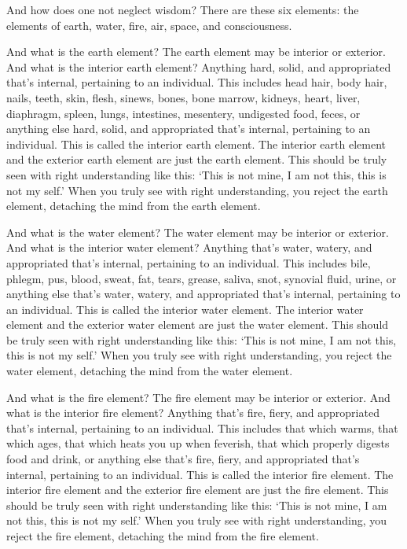 \documentclass[12pt,openany]{book}%
\begin{document}
And how does one not neglect wisdom? There are these six elements: the elements of earth, water, fire, air, space, and consciousness. 

And what is the earth element? The earth element may be interior or exterior. And what is the interior earth element? Anything hard, solid, and appropriated that’s internal, pertaining to an individual. This includes head hair, body hair, nails, teeth, skin, flesh, sinews, bones, bone marrow, kidneys, heart, liver, diaphragm, spleen, lungs, intestines, mesentery, undigested food, feces, or anything else hard, solid, and appropriated that’s internal, pertaining to an individual. This is called the interior earth element. The interior earth element and the exterior earth element are just the earth element. This should be truly seen with right understanding like this: ‘This is not mine, I am not this, this is not my self.’ When you truly see with right understanding, you reject the earth element, detaching the mind from the earth element. 

And what is the water element? The water element may be interior or exterior. And what is the interior water element? Anything that’s water, watery, and appropriated that’s internal, pertaining to an individual. This includes bile, phlegm, pus, blood, sweat, fat, tears, grease, saliva, snot, synovial fluid, urine, or anything else that’s water, watery, and appropriated that’s internal, pertaining to an individual. This is called the interior water element. The interior water element and the exterior water element are just the water element. This should be truly seen with right understanding like this: ‘This is not mine, I am not this, this is not my self.’ When you truly see with right understanding, you reject the water element, detaching the mind from the water element. 

And what is the fire element? The fire element may be interior or exterior. And what is the interior fire element? Anything that’s fire, fiery, and appropriated that’s internal, pertaining to an individual. This includes that which warms, that which ages, that which heats you up when feverish, that which properly digests food and drink, or anything else that’s fire, fiery, and appropriated that’s internal, pertaining to an individual. This is called the interior fire element. The interior fire element and the exterior fire element are just the fire element. This should be truly seen with right understanding like this: ‘This is not mine, I am not this, this is not my self.’ When you truly see with right understanding, you reject the fire element, detaching the mind from the fire element. 
\end{document}
